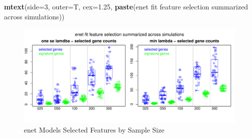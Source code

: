 \documentclass[
]{book}
\newenvironment{Shaded}{\begin{snugshade}}{\end{snugshade}}
\newcommand{\DataTypeTok}[1]{\textcolor[rgb]{0.13,0.29,0.53}{#1}}
\newcommand{\DecValTok}[1]{\textcolor[rgb]{0.00,0.00,0.81}{#1}}
\newcommand{\FloatTok}[1]{\textcolor[rgb]{0.00,0.00,0.81}{#1}}
\newcommand{\KeywordTok}[1]{\textcolor[rgb]{0.13,0.29,0.53}{\textbf{#1}}}
\newcommand{\NormalTok}[1]{#1}
\newcommand{\StringTok}[1]{\textcolor[rgb]{0.31,0.60,0.02}{#1}}
\begin{document}
\begin{Shaded}
\begin{Highlighting}[]
\KeywordTok{mtext}\NormalTok{(}\DataTypeTok{side=}\DecValTok{3}\NormalTok{, }\DataTypeTok{outer=}\NormalTok{T, }\DataTypeTok{cex=}\FloatTok{1.25}\NormalTok{, }\KeywordTok{paste}\NormalTok{(}\StringTok{\textquotesingle{}enet fit feature selection summarized across simulations\textquotesingle{}}\NormalTok{))}
\end{Highlighting}
\end{Shaded}

\begin{figure}
\centering
\includegraphics{Static/figures/enet-simRes-features-OverSim-1.pdf}
\caption{\label{fig:enet-simRes-features-OverSim}enet Models Selected Features by Sample Size}
\end{figure}
\end{document}
